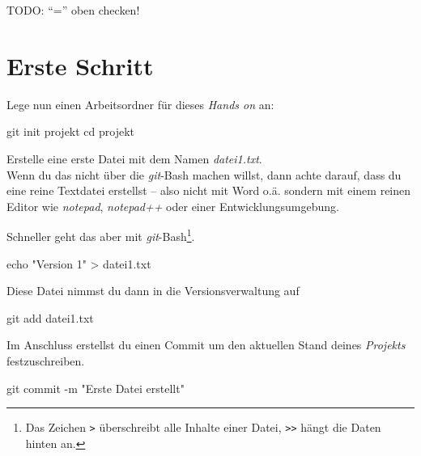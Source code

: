 \documentclass[
  letterpaper,
  DIV=11]{scrreprt}
\newenvironment{Shaded}{\begin{snugshade}}{\end{snugshade}}
\newcommand{\AttributeTok}[1]{\textcolor[rgb]{0.40,0.45,0.13}{#1}}
\newcommand{\BuiltInTok}[1]{\textcolor[rgb]{0.00,0.23,0.31}{#1}}
\newcommand{\FunctionTok}[1]{\textcolor[rgb]{0.28,0.35,0.67}{#1}}
\newcommand{\NormalTok}[1]{\textcolor[rgb]{0.00,0.23,0.31}{#1}}
\newcommand{\OperatorTok}[1]{\textcolor[rgb]{0.37,0.37,0.37}{#1}}
\newcommand{\StringTok}[1]{\textcolor[rgb]{0.13,0.47,0.30}{#1}}
\newcommand{\git}{\textit{git}\xspace}
\newcommand{\datei}[1]{\textit{#1}\xspace}
\begin{document}
TODO: ``='' oben checken!

\section{Erste Schritt}\label{erste-schritt}

Lege nun einen Arbeitsordner für dieses \emph{Hands on} an:

\begin{Shaded}
\begin{Highlighting}[]
\FunctionTok{git}\NormalTok{ init projekt }
\BuiltInTok{cd}\NormalTok{ projekt }
\end{Highlighting}
\end{Shaded}

Erstelle eine erste Datei mit dem Namen \datei{datei1.txt}.\\
Wenn du das nicht über die \git-Bash machen willst, dann achte darauf,
dass du eine reine Textdatei erstellst -- also nicht mit Word o.ä.
sondern mit einem reinen Editor wie \emph{notepad}, \emph{notepad++}
oder einer Entwicklungsumgebung.

Schneller geht das aber mit \git-Bash\footnote{Das Zeichen
  \texttt{\textgreater{}} überschreibt alle Inhalte einer Datei,
  \texttt{\textgreater{}\textgreater{}} hängt die Daten hinten an.}.

\begin{Shaded}
\begin{Highlighting}[]
\BuiltInTok{echo} \StringTok{"Version 1"} \OperatorTok{\textgreater{}}\NormalTok{ datei1.txt }
\end{Highlighting}
\end{Shaded}

Diese Datei nimmst du dann in die Versionsverwaltung auf

\begin{Shaded}
\begin{Highlighting}[]
\FunctionTok{git}\NormalTok{ add datei1.txt }
\end{Highlighting}
\end{Shaded}

Im Anschluss erstellst du einen Commit um den aktuellen Stand deines
\emph{Projekts} festzuschreiben.

\begin{Shaded}
\begin{Highlighting}[]
\FunctionTok{git}\NormalTok{ commit }\AttributeTok{{-}m} \StringTok{"Erste Datei erstellt"}
\end{Highlighting}
\end{Shaded}
\end{document}
